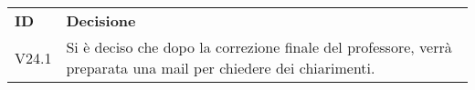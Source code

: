 \documentclass[]{article}
\begin{document}
		\begin{table} [h!]
			\begin{center}
				\begin{tabular} { m{2cm} m{14cm} }
					\rowcolor{lightgray}
					\textbf{ID} & \textbf{Decisione}\\
					V24.1 & Si è deciso che dopo la correzione finale del professore, verrà preparata una mail per chiedere dei chiarimenti.
				\end{tabular}
			\end{center}
		\end{table}		
	
\end{document}
